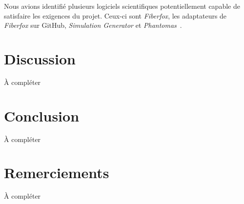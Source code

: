 \documentclass{article}
\begin{document}
  Nous avions identifié plusieurs logiciels scientifiques potentiellement capable de satisfaire les exigences du projet.
  Ceux-ci sont \textit{Fiberfox}, les adaptateurs de \textit{Fiberfox} sur GitHub, \textit{Simulation Generator} et \textit{Phantomas}~\citep{caruyer2014phantomas}.



  \section{Discussion}
  \label{sec:discussion}
  À compléter


  \section{Conclusion}
  À compléter

  \section*{Remerciements}
  À compléter

  
  
\end{document}
